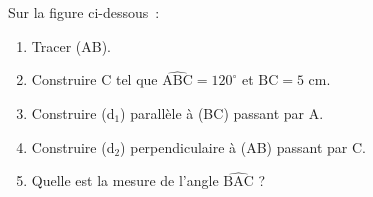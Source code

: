 \documentclass[exercice]{thedocument}%
\begin{document}
%
Sur la figure ci-dessous~:
\begin{enumerate}
    \item Tracer (AB).
    \item Construire C tel que $\widehat{\text{ABC}}=120^\circ$ et $\text{BC}=5$ cm.
    \item Construire (d$_1$) parallèle à (BC) passant par A.
    \item Construire (d$_2$) perpendiculaire à (AB) passant par C.
    \item Quelle est la mesure de l'angle $\widehat{\text{BAC}}$ ?
\end{enumerate}\vskip50pt
\begin{center}
\end{center}
\end{document}
